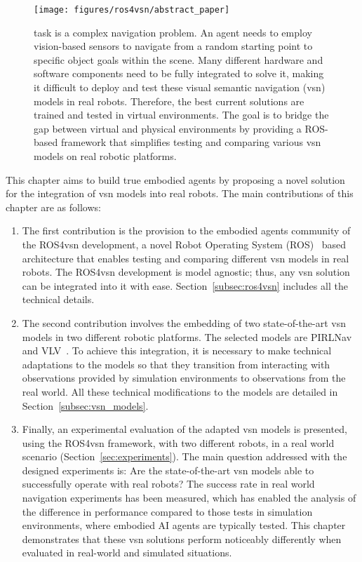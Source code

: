 \begin{figure}
    \centering
        \texttt{[image: figures/ros4vsn/abstract\_paper]}
        \caption{
        \objnav task is a complex navigation problem.
        An agent needs to employ vision-based sensors to navigate from a random starting point to specific object goals within the scene.
        Many different hardware and software components need to be fully integrated to solve it, making it difficult to deploy and test these visual semantic navigation (\acrshort{vsn}) models in real robots.
        Therefore, the best current solutions are trained and tested in virtual environments.
        The goal is to bridge the gap between virtual and physical environments by providing a ROS-based framework that simplifies testing and comparing various \acrshort{vsn} models on real robotic platforms.
        }
        \label{fig:abstract_ros4vsn}
\end{figure}

This chapter aims to build true embodied agents by proposing a novel solution for the integration of \acrshort{vsn} models into real robots.
The main contributions of this chapter are as follows:
\begin{enumerate}
 \item The first contribution is the provision to the embodied agents community of the ROS4\acrshort{vsn} development, a novel Robot Operating System (ROS)~\cite{ros} based architecture that enables testing and comparing different \acrshort{vsn} models in real robots.
 The ROS4\acrshort{vsn} development is model agnostic; thus, any \acrshort{vsn} solution can be integrated into it with ease.
 Section~\ref{subsec:ros4vsn} includes all the technical details.
 \item The second contribution involves the embedding of two state-of-the-art \acrshort{vsn} models in two different robotic platforms.
 The selected models are PIRLNav~\cite{ramrakhya2023} and VLV~\cite{chang2020}.
 To achieve this integration, it is necessary to make technical adaptations to the models so that they transition from interacting with observations provided by simulation environments to observations from the real world.
 All these technical modifications to the models are detailed in Section~\ref{subsec:vsn_models}.
 \item Finally, an experimental evaluation of the adapted \acrshort{vsn} models is presented, using the ROS4\acrshort{vsn} framework, with two different robots, in a real world scenario (Section~\ref{sec:experiments}).
 The main question addressed with the designed experiments is: Are the state-of-the-art \acrshort{vsn} models able to successfully operate with real robots?
 The success rate in real world navigation experiments has been measured, which has enabled the analysis of the difference in performance compared to those tests in simulation environments, where embodied AI agents are typically tested.
 This chapter demonstrates that these \acrshort{vsn} solutions perform noticeably differently when evaluated in real-world and simulated situations.
\end{enumerate}

